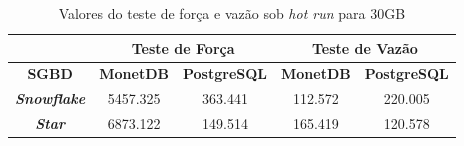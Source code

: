 \begin{table}[htpb]
        \centering
        \caption{Valores do teste de força e vazão sob \textit{hot run} para 30GB}
        \label{tab:forca_vazao_hot_30}
        \begin{tabular}{|c|c|c|c|c|} 
                \cline{2-5}
                \multicolumn{1}{c|}{}         & \multicolumn{2}{c|}{\textbf{Teste de Força} } & \multicolumn{2}{c|}{\textbf{Teste de Vazão} }  \\ 
                \hline
                 \textbf{SGBD}                & \textbf{MonetDB}  & \textbf{PostgreSQL}       & \textbf{MonetDB}  & \textbf{PostgreSQL}        \\ 
                \hline
                 \textit{\textbf{Snowflake}}  & 5457.325          & 363.441                   & 112.572           & 220.005                    \\ 
                \hline
                 \textit{\textbf{Star}}       & 6873.122          & 149.514                   & 165.419           & 120.578                    \\
                \hline
                \end{tabular}
                \end{table}

